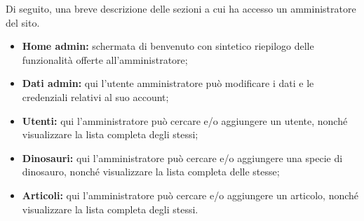 \documentclass[12pt]{article}
\begin{document}
	Di seguito, una breve descrizione delle sezioni a cui ha accesso un amministratore del sito.
	
	\begin{itemize}
		\item \textbf{Home admin:} schermata di benvenuto con sintetico riepilogo delle funzionalità offerte all'amministratore;
		
		\item \textbf{Dati admin:} qui l'utente amministratore può modificare i dati e le credenziali relativi al suo account;
		
		\item \textbf{Utenti:} qui l'amministratore può cercare e/o aggiungere un utente, nonché visualizzare la lista completa degli stessi;
		
		\item \textbf{Dinosauri:} qui l'amministratore può cercare e/o aggiungere una specie di dinosauro, nonché visualizzare la lista completa delle stesse;
		
		\item \textbf{Articoli:} qui l'amministratore può cercare e/o aggiungere un articolo, nonché visualizzare la lista completa degli stessi.
	\end{itemize}
	
	
\end{document}
